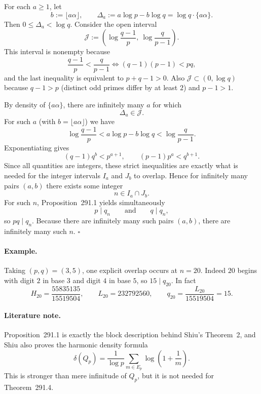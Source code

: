 For each $a\ge 1$, let
\[
b:=\lfloor a\alpha\rfloor,
\qquad
\Delta_a:=a\log p-b\log q=\log q\cdot \{a\alpha\}.
\]
Then $0\le \Delta_a<\log q$.
Consider the open interval
\[
\mathcal J:=\left(\log\frac{q-1}{p},\ \log\frac{q}{p-1}\right).
\]
This interval is nonempty because
\[
\frac{q-1}{p}<\frac{q}{p-1}
\iff
(q-1)(p-1)<pq,
\]
and the last inequality is equivalent to $p+q-1>0$.
Also $\mathcal J\subset(0,\log q)$ because $q-1>p$ (distinct odd primes differ by at least $2$) and $p-1>1$.

By density of $\{a\alpha\}$, there are infinitely many $a$ for which
\[
\Delta_a\in\mathcal J.
\]
For such $a$ (with $b=\lfloor a\alpha\rfloor$) we have
\[
\log\frac{q-1}{p}<a\log p-b\log q<\log\frac{q}{p-1}.
\]
Exponentiating gives
\[
(q-1)q^b<p^{a+1},
\qquad
(p-1)p^a<q^{b+1}.
\]
Since all quantities are integers, these strict inequalities are exactly what is needed for the integer intervals $I_a$ and $J_b$ to overlap.
Hence for infinitely many pairs $(a,b)$ there exists some integer
\[
n\in I_a\cap J_b.
\]
For such $n$, Proposition~291.1 yields simultaneously
\[
p\mid q_n
\qquad\text{and}\qquad
q\mid q_n,
\]
so $pq\mid q_n$.
Because there are infinitely many such pairs $(a,b)$, there are infinitely many such $n$. \hfill$\square$

\paragraph{Example.}
Taking $(p,q)=(3,5)$, one explicit overlap occurs at $n=20$.
Indeed $20$ begins with digit $2$ in base $3$ and digit $4$ in base $5$, so $15\mid q_{20}$.
In fact
\[
H_{20}=\frac{55835135}{15519504},
\qquad
L_{20}=232792560,
\qquad
q_{20}=\frac{L_{20}}{15519504}=15.
\]

\paragraph{Literature note.}
Proposition~291.1 is exactly the block description behind Shiu's Theorem~2, and Shiu also proves the harmonic density formula
\[
\delta(Q_p)=\frac{1}{\log p}\sum_{m\in E_p}\log\left(1+\frac1m\right).
\]
This is stronger than mere infinitude of $Q_p$, but it is not needed for Theorem~291.4.

